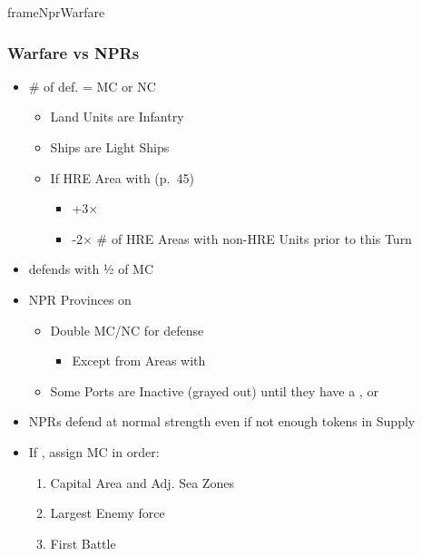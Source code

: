 \documentclass[10pt]{article}
\newlength{\fhNprWarfare} \setlength\fhNprWarfare{20\baselineskip}
\begin{document}
\begin{dynamiccontents*}{frameNprWarfare}\begin{eubox}{\fhNprWarfare}
	\subsubsection*{Warfare vs NPRs }
	\begin{itemize}
		\item {}\# of def.  = MC or NC
		\begin{itemize}
			\item Land Units are Infantry
			\item Ships are Light Ships
			\item If HRE Area with  (p.~45)
			\begin{itemize}
				\item +3× \authority
				\item -2× \# of HRE Areas with non-HRE Units prior to this Turn
			\end{itemize}
		\end{itemize}
		\item {} defends with ½ of MC
		\item NPR Provinces on 
		\begin{itemize}
			\item Double MC/NC for defense
			\begin{itemize}
				\item Except from Areas with \plague
			\end{itemize}
			\item Some Ports are Inactive (grayed out) until they have a \dnpr, \town or \vassal
		\end{itemize}
		\item NPRs defend at normal strength even if not enough tokens in Supply
		\item If , assign MC in order:
		\begin{enumerate}
			\item Capital Area and Adj. Sea Zones
			\item Largest Enemy force
			\item First Battle
		\end{enumerate}
	\end{itemize}
\end{eubox}\end{dynamiccontents*}
\end{document}
